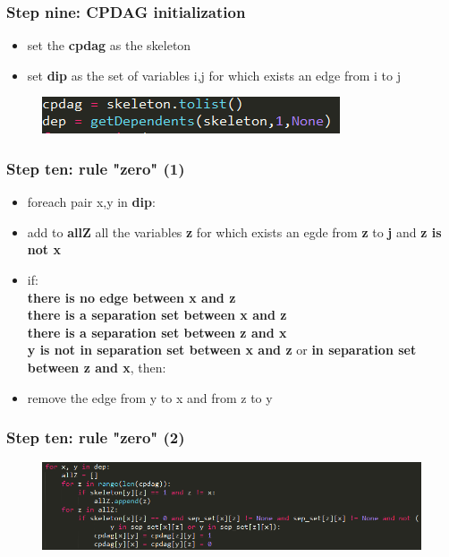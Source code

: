 \documentclass[xcolor ={table,usenames,dvipsnames}]{beamer}
\theoremstyle{definition}
\begin{document}
\begin{frame}
\frametitle{Step nine: CPDAG initialization}
\begin{itemize}
	\item set the \textbf{cpdag} as the skeleton
	\item set \textbf{dip} as the set of variables i,j for which exists an edge from i to j
\end{itemize}
	\begin{figure}[h!]
		\centering
		\includegraphics[scale=0.5]{img/cpdaginit.PNG}
		\label{Interfacce di un CS}
	\end{figure}
\end{frame}
\begin{frame}
\frametitle{Step ten: rule "zero" (1)}
\begin{itemize}
	\item foreach pair x,y in \textbf{dip}:
	\item add to \textbf{allZ} all the variables \textbf{z} for which exists an egde from \textbf{z} to \textbf{j} and \textbf{z is not x}
	\item if:\\\textbf{there is no edge between x and z}\\ \textbf{there is a separation set between x and z}\\\textbf{there is a separation set between z and x}\\\textbf{y is not in separation set between x and z} or \textbf{in separation set between z and x}, then:
	\item remove the edge from y to x and from z to y
\end{itemize}
\end{frame}
\begin{frame}
\frametitle{Step ten: rule "zero" (2)}
	\begin{figure}[h!]
		\centering
		\includegraphics[scale=0.5]{img/rulezero.PNG}
		\label{Interfacce di un CS}
	\end{figure}
\end{frame}
\end{document}

